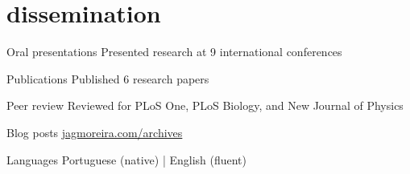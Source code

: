 
\section{dissemination}

\begin{entrylist}


\shortentry
{Oral presentations}    %
{Presented research at 9 international conferences}  %


\shortentry
{Publications}
{Published 6 research papers}


\shortentry
{Peer review}
{Reviewed for PLoS One, PLoS Biology, and New Journal of Physics}


\shortentry
{Blog posts}
{\href{http://jagmoreira.com/archives}{jagmoreira.com/archives}}

\shortentry
{Languages}
{Portuguese (native) | English (fluent)}


\end{entrylist}
